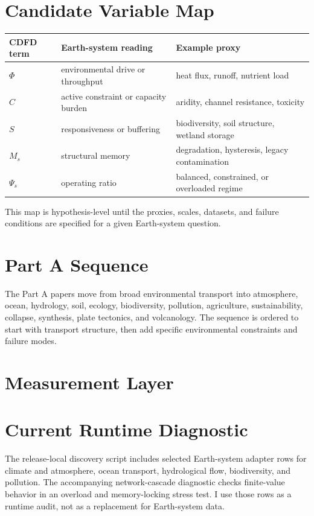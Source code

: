 \documentclass[12pt,a4paper]{article}
\begin{document}
\section{Candidate Variable Map}

\begin{table}[h]
\centering
\begin{tabularx}{\textwidth}{@{}lXX@{}}
\toprule
CDFD term & Earth-system reading & Example proxy \\
\midrule
$\Phi$ & environmental drive or throughput & heat flux, runoff, nutrient load \\
$C$ & active constraint or capacity burden & aridity, channel resistance, toxicity \\
$S$ & responsiveness or buffering & biodiversity, soil structure, wetland storage \\
$M_s$ & structural memory & degradation, hysteresis, legacy contamination \\
$\Psi_s$ & operating ratio & balanced, constrained, or overloaded regime \\
\bottomrule
\end{tabularx}
\end{table}

This map is hypothesis-level until the proxies, scales, datasets, and failure
conditions are specified for a given Earth-system question.

\section{Part A Sequence}

The Part A papers move from broad environmental transport into atmosphere,
ocean, hydrology, soil, ecology, biodiversity, pollution, agriculture,
sustainability, collapse, synthesis, plate tectonics, and volcanology. The
sequence is ordered to start with transport structure, then add specific
environmental constraints and failure modes.

\section{Measurement Layer}

\section{Current Runtime Diagnostic}

The release-local discovery script
includes selected Earth-system adapter rows for climate and atmosphere, ocean
transport, hydrological flow, biodiversity, and pollution. The accompanying
network-cascade diagnostic checks finite-value behavior in an overload and
memory-locking stress test. I use those rows as a runtime audit, not as a
replacement for Earth-system data.
\end{document}
